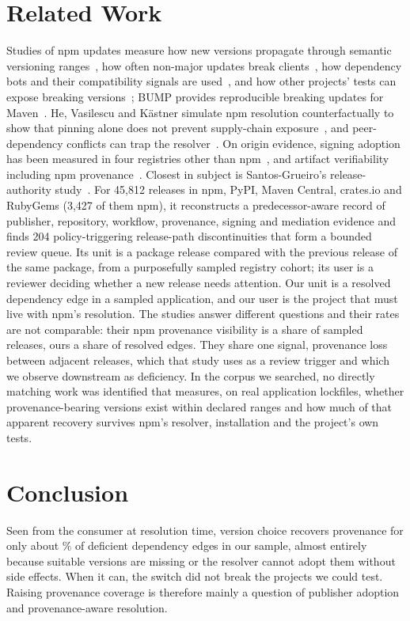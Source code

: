 \documentclass[conference]{IEEEtran}
\begin{document}
\section{Related Work}
Studies of npm updates measure how new versions propagate through semantic
versioning ranges~\cite{pinckney2023semver}, how often non-major updates break
clients~\cite{venturini2023broke}, how dependency bots and their
compatibility signals are used~\cite{he2023dependabot,rombaut2024crowd}, and
how other projects' tests can expose breaking versions~\cite{mujahid2020tests};
BUMP provides reproducible breaking updates for Maven~\cite{reyes2024bump}.
He, Vasilescu and K\"astner simulate npm resolution counterfactually to show
that pinning alone does not prevent supply-chain exposure~\cite{he2025pinning},
and peer-dependency conflicts can trap the resolver~\cite{wang2025peerspin}.
On origin evidence, signing adoption has been measured in four registries
other than npm~\cite{schorlemmer2024signing}, and artifact verifiability
including npm provenance~\cite{solarin2026verifiability}. Closest in subject
is Santos-Grueiro's release-authority study~\cite{santos2026authority}. For
45,812 releases in npm, PyPI, Maven Central, crates.io and RubyGems (3,427 of
them npm), it reconstructs a predecessor-aware record of publisher,
repository, workflow, provenance, signing and mediation evidence and finds 204
policy-triggering release-path discontinuities that form a bounded review
queue. Its unit is a package release compared with the previous release of
the same package, from a purposefully sampled registry cohort; its user is a
reviewer deciding whether a new release needs attention. Our unit is a
resolved dependency edge in a sampled application, and our user is the
project that must live with npm's resolution. The studies answer different
questions and their rates are not comparable: their npm provenance visibility
is a share of sampled releases, ours a share of resolved edges. They share one
signal, provenance loss between adjacent releases, which that study uses as a
review trigger and which we observe downstream as deficiency.
In the corpus we searched, no directly matching work was identified that
measures, on real application lockfiles, whether provenance-bearing versions
exist within declared ranges and how much of that apparent recovery survives
npm's resolver, installation and the project's own tests.

\section{Conclusion}
Seen from the consumer at resolution time, version choice recovers provenance
for only about \SEndToEnd\% of deficient dependency edges in our sample, almost entirely because suitable versions are
missing or the resolver cannot adopt them without side effects. When it can,
the switch did not break the projects we could test. Raising provenance
coverage is therefore mainly a question of publisher adoption and
provenance-aware resolution.
\end{document}
